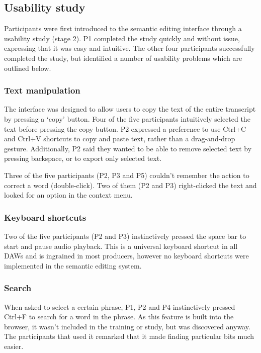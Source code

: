 \subsection{Usability study}
Participants were first introduced to the semantic editing interface through a
usability study (stage 2). P1 completed the study quickly and without issue,
expressing that it was easy and intuitive. The other four participants
successfully completed the study, but identified a number of usability problems
which are outlined below.

\subsubsection{Text manipulation}
The interface was designed to allow users to copy the text of the entire
transcript by pressing a `copy' button. Four of the five participants
intuitively selected the text before pressing the copy button.  P2 expressed a
preference to use Ctrl+C and Ctrl+V shortcuts to copy and paste text, rather
than a drag-and-drop gesture.  Additionally, P2 said they wanted to be able to
remove selected text by pressing backspace, or to export only selected text.


Three of the five participants (P2, P3 and P5) couldn't remember the action to
correct a word (double-click). Two of them (P2 and P3) right-clicked the text
and looked for an option in the context menu.

\subsubsection{Keyboard shortcuts}
Two of the five participants (P2 and P3) instinctively pressed the space bar to
start and pause audio playback. This is a universal keyboard shortcut in all
DAWs and is ingrained in most producers, however no keyboard shortcuts were
implemented in the semantic editing system.

\subsubsection{Search}
When asked to select a certain phrase, P1, P2 and P4 instinctively pressed
Ctrl+F to search for a word in the phrase. As this feature is built into the
browser, it wasn't included in the training or study, but was discovered
anyway. The participants that used it remarked that it made finding particular
bits much easier.

